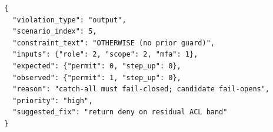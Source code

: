\begin{lstlisting}[language={},basicstyle=\ttfamily\footnotesize,frame=single,
  caption={Semantic Feedback IR on the ACL catch-all witness
    $(\mathit{role}{=}2,\mathit{scope}{=}2,\mathit{mfa}{=}1)$:
    busy guest/admin tests passed; residual fail-open is exposed.},
  label={lst:acl-ir}]
{
  "violation_type": "output",
  "scenario_index": 5,
  "constraint_text": "OTHERWISE (no prior guard)",
  "inputs": {"role": 2, "scope": 2, "mfa": 1},
  "expected": {"permit": 0, "step_up": 0},
  "observed": {"permit": 1, "step_up": 0},
  "reason": "catch-all must fail-closed; candidate fail-opens",
  "priority": "high",
  "suggested_fix": "return deny on residual ACL band"
}
\end{lstlisting}

